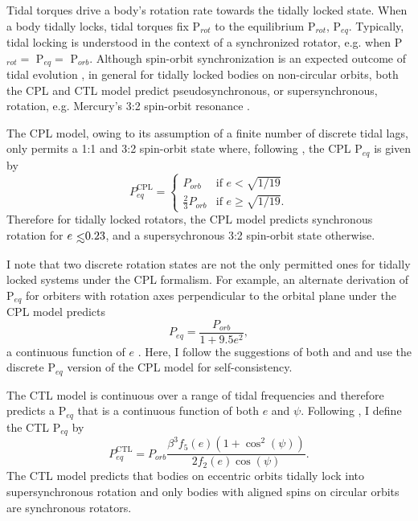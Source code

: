 Tidal torques drive a body's rotation rate towards the tidally locked state. When a body tidally locks, tidal torques fix P$_{rot}$ to the equilibrium P$_{rot}$, P$_{eq}$.  Typically, tidal locking is understood in the context of a synchronized rotator, e.g. when P$_{rot} = $ P$_{eq} = $ P$_{orb}$. Although spin-orbit synchronization is an expected outcome of tidal evolution \citep{Counselman1973}, in general for tidally locked bodies on non-circular orbits, both the CPL and CTL model predict pseudosynchronous, or supersynchronous, rotation, e.g. Mercury's 3:2 spin-orbit resonance \citep[P$_{rot} = 2/3$ P$_{orb}$,][]{GoldreichPeale1966}.   

The CPL model, owing to its assumption of a finite number of discrete tidal lags, only permits a 1:1 and 3:2 spin-orbit state where, following \citet{Barnes2017}, the CPL P$_{eq}$ is given by
\begin{equation} \label{sync:eqn:cpl:eqPer}
P^{\mathrm{CPL}}_{eq} = 
\begin{cases}
P_{orb} & \text{if } e < \sqrt{1/19}\\
\frac{2}{3}P_{orb} & \text{if } e \geq \sqrt{1/19}.
\end{cases}
\end{equation}
Therefore for tidally locked rotators, the CPL model predicts synchronous rotation for $e \lsim 0.23$, and a supersychronous 3:2 spin-orbit state otherwise.

I note that two discrete rotation states are not the only permitted ones for tidally locked systems under the CPL formalism. For example, an alternate derivation of P$_{eq}$ for orbiters with rotation axes perpendicular to the orbital plane under the CPL model predicts
\begin{equation} \label{sync:eqn:cpl:eqPerCont}
P_{eq} = \frac{P_{orb}}{1 + 9.5e^2},
\end{equation}
a continuous function of $e$ \citep{Goldreich1966b,Murray1999}. Here, I follow the suggestions of both \citet{Barnes2013} and \citet{Barnes2017} and use the discrete P$_{eq}$ version of the CPL model for self-consistency.

The CTL model is continuous over a range of tidal frequencies and therefore predicts a P$_{eq}$ that is a continuous function of both $e$ and $\psi$.  Following \citet{Barnes2017}, I define the CTL P$_{eq}$ by
\begin{equation} \label{sync:eqn:ctl:eqPer}
P^{\mathrm{CTL}}_{eq} = P_{orb} \frac{\beta^3 f_5(e) (1 + \cos^2(\psi))}{2f_2(e) \cos(\psi)}.
\end{equation}
The CTL model predicts that bodies on eccentric orbits tidally lock into supersynchronous rotation and only bodies with aligned spins on circular orbits are synchronous rotators. 


